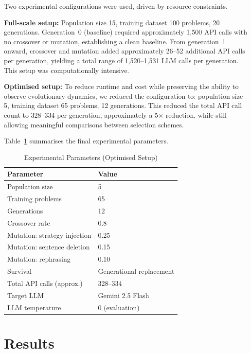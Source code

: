 \documentclass[conference]{IEEEtran}
\begin{document}
Two experimental configurations were used, driven by resource constraints.

\textbf{Full-scale setup:} Population size 15, training dataset 100 problems, 20
generations. Generation~0 (baseline) required approximately 1,500 API calls with no
crossover or mutation, establishing a clean baseline. From generation~1 onward, crossover
and mutation added approximately 26--52 additional API calls per generation, yielding a
total range of 1,520--1,531 LLM calls per generation. This setup was computationally intensive.

\textbf{Optimised setup:} To reduce runtime and cost while preserving the ability to
observe evolutionary dynamics, we reduced the configuration to: population size 5, training
dataset 65 problems, 12 generations. This reduced the total API call count to 328--334 per
generation, approximately a 5$\times$ reduction, while still allowing meaningful comparisons
between selection schemes.

Table~\ref{tab:params} summarises the final experimental parameters.

\begin{table}[htbp]
\caption{Experimental Parameters (Optimised Setup)}
\label{tab:params}
\centering
\begin{tabular}{ll}
\toprule
\textbf{Parameter} & \textbf{Value} \\
\midrule
Population size & 5 \\
Training problems & 65 \\
Generations & 12 \\
Crossover rate & 0.8 \\
Mutation: strategy injection & 0.25 \\
Mutation: sentence deletion & 0.15 \\
Mutation: rephrasing & 0.10 \\
Survival & Generational replacement \\
Total API calls (approx.) & 328--334 \\
Target LLM & Gemini 2.5 Flash \\
LLM temperature & 0 (evaluation) \\
\bottomrule
\end{tabular}
\end{table}

\section{Results}
\label{sec:results}
\end{document}
